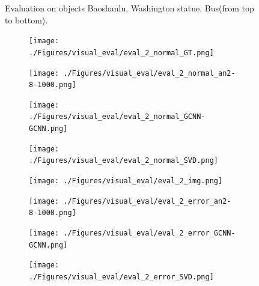 \documentclass[border=15pt, multi, tikz]{article}
\begin{document}
\begin{figure}
	
	
	\caption{Evaluation on objects Baoshanlu, Washington statue, Bus(from top to bottom).}
	\label{fig:final-eval}
\end{figure}


\begin{figure}
	\centering
	\begin{subfigure}[b]{0.24\linewidth}
		\texttt{[image: ./Figures/visual\_eval/eval\_2\_normal\_GT.png]}
	\end{subfigure}
	\begin{subfigure}[b]{0.24\linewidth}
		\texttt{[image: ./Figures/visual\_eval/eval\_2\_normal\_an2-8-1000.png]}
	\end{subfigure}
	\begin{subfigure}[b]{0.24\linewidth}
		\texttt{[image: ./Figures/visual\_eval/eval\_2\_normal\_GCNN-GCNN.png]}
	\end{subfigure}
	\begin{subfigure}[b]{0.24\linewidth}
		\texttt{[image: ./Figures/visual\_eval/eval\_2\_normal\_SVD.png]}
	\end{subfigure}
	
	\begin{subfigure}[b]{0.24\linewidth}
		\texttt{[image: ./Figures/visual\_eval/eval\_2\_img.png]}
	\end{subfigure}
	\begin{subfigure}[b]{0.24\linewidth}
		\texttt{[image: ./Figures/visual\_eval/eval\_2\_error\_an2-8-1000.png]}
	\end{subfigure}
	\begin{subfigure}[b]{0.24\linewidth}
		\texttt{[image: ./Figures/visual\_eval/eval\_2\_error\_GCNN-GCNN.png]}
	\end{subfigure}
	\begin{subfigure}[b]{0.24\linewidth}
		\texttt{[image: ./Figures/visual\_eval/eval\_2\_error\_SVD.png]}
	\end{subfigure}
	
	
	

\end{figure}
\end{document}
